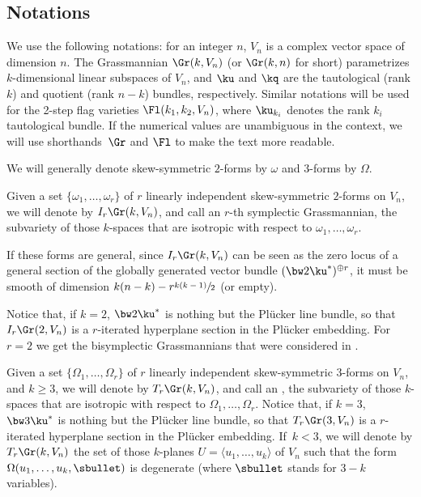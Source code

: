\subsection*{Notations}

We use the following notations: for an integer $n$, $V_n$ is a complex vector space of dimension
$n$. The Grassmannian $\Gr(k,V_n)$ (or $\Gr(k,n)$ for short)
parametrizes $k$-dimensional linear subspaces of $V_n$, and
$\ku$ and $\kq$ are the tautological (rank $k$)
and quotient (rank $n-k$) bundles, respectively. Similar notations will be used for the 2-step flag
varieties $\Fl(k_1,k_2,V_n)$, where $\ku_{k_i}$ denotes the rank $k_i$ tautological
bundle. If the numerical values are unambiguous in the context, we will use shorthands~$\Gr$ and $\Fl$ to make the text more readable.

We will generally denote skew-symmetric $2$-forms by $\omega$ and $3$-forms by
$\Omega$.

Given a set $\{\omega_1,\ldots,\omega_r\}$ of
$r$ linearly independent skew-symmetric $2$-forms on $V_n$, we will denote by $I_r\Gr(k,V_n)$,
and call an $r$-th symplectic Grassmannian,
the subvariety of those $k$-spaces that are isotropic with respect to $\omega_1,\ldots,\omega_r$.

If these forms are general, since $I_r\Gr(k,V_n)$ can be seen as the zero locus of a general section of the globally generated vector bundle $(\bw2 \ku^*)^{\oplus r}$,
it must be smooth of dimension $k(n-k) - r \sfrac{k(k-1)}{2}$ (or empty).

Notice that, if $k=2$, $\bw2 \ku^*$ is nothing but the Plücker line bundle, so that
$I_r \Gr(2,V_n)$ is a $r$-iterated hyperplane section in the Plücker embedding.
For $r=2$ we get the bisymplectic Grassmannians that
were considered in \cite{vlad-bi}.

Given a set $\{\Omega_1,\ldots,\Omega_r\}$ of
$r$ linearly independent skew-symmetric $3$-forms on $V_n$, and $k \geq 3$, we will denote by $T_r\Gr(k,V_n)$, and call an , the subvariety of those $k$-spaces that are isotropic with respect to $\Omega_1,\ldots,\Omega_r$. Notice that, if $k=3$,
$\bw3 \ku^*$ is nothing but the Plücker line bundle, so that
$T_r \Gr(3,V_n)$ is a $r$-iterated hyperplane section in the Plücker embedding.
If~$k < 3$, we will denote by $T_r \Gr(k,V_n)$ the set of those $k$-planes $U=\langle u_1,\ldots , u_k\rangle $ of $V_n$ such that the form $\Omega(u_1,\ldots , u_k,\sbullet)$ is degenerate (where $\sbullet$ stands for $3-k$ variables).

